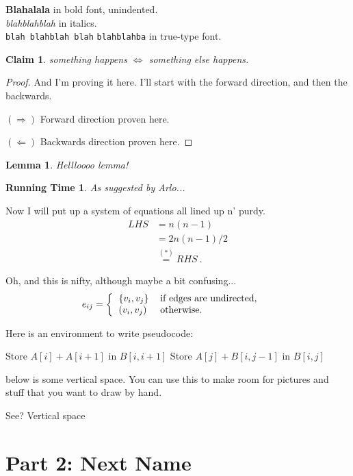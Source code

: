 \documentclass[11pt]{article}
\newtheorem{lemma}{Lemma}
\newtheorem*{claim}{Claim}
\newtheorem*{rt}{Running Time}
\begin{document}
\noindent \textbf{Blahalala} in bold font, unindented.\\
 
\noindent \emph{blahblahblah} in italics. \\

\noindent \verb+blah blahblah blah+ \texttt{blahblahba} in true-type font.\\ 

\begin{claim}
something happens $\iff$ something else happens.
\end{claim}

\begin{proof}And I'm proving it here. I'll start with the forward direction, and then the backwards.\medskip

\noindent $(\Rightarrow)$ Forward direction proven here.\medskip

\noindent $(\Leftarrow)$ Backwards direction proven here.\end{proof}

\begin{lemma}
Hellloooo lemma!
\end{lemma}

\begin{rt}
As suggested by Arlo...
\end{rt}

\newpage
\vspace*{2pt}

Now I will put up a system of equations all lined up n' purdy.
\begin{align*}
LHS &=  n(n-1) \\
&=  2n(n-1)/2 \\
& \stackrel{(*)}{=}  RHS~.
\end{align*}

Oh, and this is nifty, although maybe a bit confusing...
\begin{align*}
e_{ij} &=  \left\{ \begin{tabular}{ll} $\{v_i, v_j\}$ & if edges are undirected, \\
						       $(v_i, v_j)$ & otherwise. \end{tabular} \right.
\end{align*}

Here is an environment to write pseudocode:
\begin{algorithmic}
\STATE Store $A[i]+A[i+1]$ in $B[i,i+1]$ 
\STATE Store $A[j]+B[i,j-1]$ in $B[i,j]$
\ENDFOR
\ENDFOR
\end{algorithmic}

below is some vertical space. You can use this to make room for pictures and stuff that you want to draw by hand.

\vspace{4cm}

See? Vertical space

\section*{Part  2: Next Name} 


\end{document}
